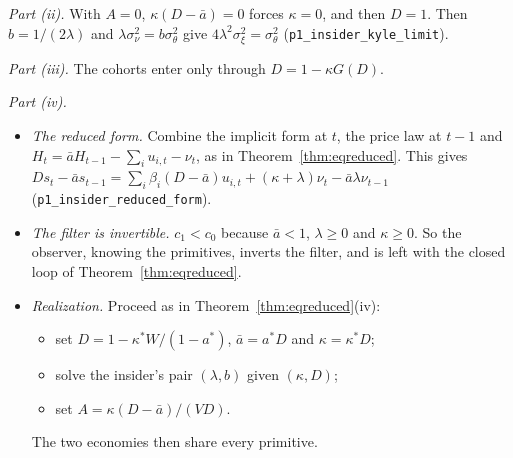 \documentclass[12pt]{article}
\theoremstyle{definition}
\theoremstyle{remark}
\begin{document}
\emph{Part (ii).} With $A=0$, $\kappa(D-\bar a)=0$ forces $\kappa=0$, and then $D=1$. Then $b=1/(2\lambda)$ and $\lambda\sigma_\nu^2=b\sigma_\theta^2$ give $4\lambda^2\sigma_\xi^2=\sigma_\theta^2$ (\nolinkurl{p1_insider_kyle_limit}).

\emph{Part (iii).} The cohorts enter only through $D=1-\kappa G(D)$.

\emph{Part (iv).}
\begin{itemize}[itemsep=1pt,topsep=2pt]
\item \emph{The reduced form.} Combine the implicit form at $t$, the price law at $t-1$ and $H_t=\bar aH_{t-1}-\sum_iu_{i,t}-\nu_t$, as in Theorem~\ref{thm:eqreduced}. This gives $Ds_t-\bar as_{t-1}=\sum_i\beta_i(D-\bar a)u_{i,t}+(\kappa+\lambda)\nu_t-\bar a\lambda\nu_{t-1}$ (\nolinkurl{p1_insider_reduced_form}).
\item \emph{The filter is invertible.} $c_1<c_0$ because $\bar a<1$, $\lambda\ge0$ and $\kappa\ge0$. So the observer, knowing the primitives, inverts the filter, and is left with the closed loop of Theorem~\ref{thm:eqreduced}.
\item \emph{Realization.} Proceed as in Theorem~\ref{thm:eqreduced}(iv):
 \begin{itemize}[itemsep=1pt,topsep=2pt]
 \item set $D=1-\kappa^*W/(1-a^*)$, $\bar a=a^*D$ and $\kappa=\kappa^*D$;
 \item solve the insider's pair $(\lambda,b)$ given $(\kappa,D)$;
 \item set $A=\kappa(D-\bar a)/(VD)$.
 \end{itemize}
 The two economies then share every primitive.
\end{itemize}
\end{document}
